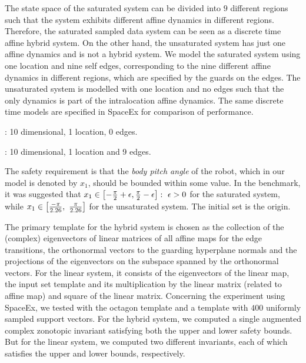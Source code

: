 
The state space of the saturated system can be divided into $9$
different regions such that the system exhibits different affine
dynamics in different regions.  Therefore, the saturated sampled data
system can be seen as a discrete time affine hybrid system.  On the
other hand, the unsaturated system has just one affine dynamics and is
not a hybrid system.  We model the saturated system using one location
and nine self edges, corresponding to the nine different affine
dynamics in different regions, which are specified by the guards on
the edges.  The unsaturated system is modelled with one location and no
edges such that the only dynamics is part of the intralocation affine
dynamics. The same discrete time models are specified in SpaceEx for
comparison of performance.


: 10 dimensional, 1 location, 0 edges.

: 10 dimensional, 1 location and 9 edges.

The safety requirement is that the \emph{body pitch angle} of the
robot, which in our model is denoted by $x_1$, should be bounded
within some value. In the benchmark, it was suggested that
$x_1\in\left[-\frac{\pi}{2}+\epsilon,\frac{\pi}{2}-\epsilon\right]:~\epsilon>0$
for the saturated system, while
$x_1\in\left[\frac{-\pi}{2.26},~\frac{\pi}{2.26}\right]$ for the
unsaturated system. The initial set is the origin.
\smallskip

  The primary template for the hybrid system is
chosen as the collection of the (complex) eigenvectors of linear
matrices of all affine maps for the edge transitions, the orthonormal
vectors to the guarding hyperplane normals and the projections of the
eigenvectors on the subspace spanned by the orthonormal vectors.  For
the linear system, it consists of the eigenvectors of the linear map,
the input set template and its multiplication by the linear matrix
(related to affine map) and square of the linear matrix. Concerning the experiment using
SpaceEx, we tested with the octagon template and a
template with $400$ uniformly sampled support vectors.  For the hybrid
system, we computed a single augmented complex zonotopic invariant
satisfying both the upper and lower safety bounds.  But for the linear
system, we computed two different invariants, each of which satisfies the
upper and lower bounds, respectively.

